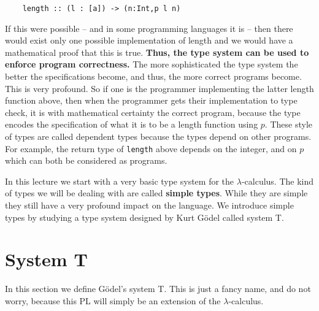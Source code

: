 \documentclass{article}
\begin{document}
\begin{center}
  \begin{verbatim}
    length :: (l : [a]) -> (n:Int,p l n)
  \end{verbatim}
\end{center}
If this were possible -- and in some programming languages it is --
then there would exist only one possible implementation of length and
we would have a mathematical proof that this is true.  \textbf{Thus,
  the type system can be used to enforce program correctness.}  The
more sophisticated the type system the better the specifications
become, and thus, the more correct programs become.  This is very
profound.  So if one is the programmer implementing the latter length
function above, then when the programmer gets their implementation to
type check, it is with mathematical certainty the correct program,
because the type encodes the specification of what it is to be a
length function using $p$.  These style of types are called dependent
types because the types depend on other programs.  For example, the
return type of \verb=length= above depends on the integer, and on $p$
which can both be considered as programs.

In this lecture we start with a very basic type system for the
$\lambda$-calculus.  The kind of types we will be dealing with are
called \textbf{simple types}.  While they are simple they still have a
very profound impact on the language.  We introduce simple types by
studying a type system designed by Kurt G\"odel called system T.

\section{System T}
\label{sec:system_t}
In this section we define G\"odel's system T.  This is just a fancy
name, and do not worry, because this PL will simply be an extension of
the $\lambda$-calculus.  
\end{document}
